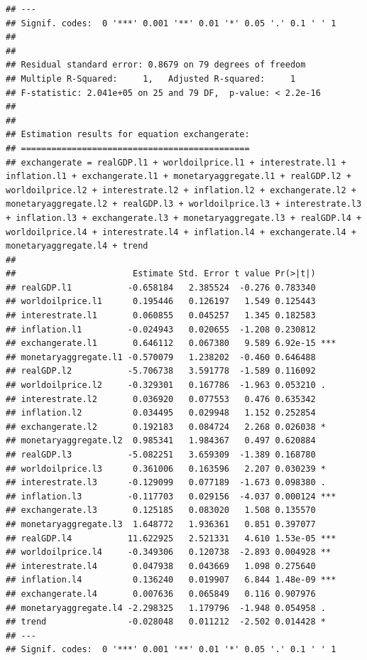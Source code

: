 \documentclass[11pt,preprint, authoryear]{elsarticle}
\numberwithin{equation}{section}
\numberwithin{figure}{section}
\numberwithin{table}{section}
\begin{document}
\begin{verbatim}
## ---
## Signif. codes:  0 '***' 0.001 '**' 0.01 '*' 0.05 '.' 0.1 ' ' 1
## 
## 
## Residual standard error: 0.8679 on 79 degrees of freedom
## Multiple R-Squared:     1,   Adjusted R-squared:     1 
## F-statistic: 2.041e+05 on 25 and 79 DF,  p-value: < 2.2e-16 
## 
## 
## Estimation results for equation exchangerate: 
## ============================================= 
## exchangerate = realGDP.l1 + worldoilprice.l1 + interestrate.l1 + inflation.l1 + exchangerate.l1 + monetaryaggregate.l1 + realGDP.l2 + worldoilprice.l2 + interestrate.l2 + inflation.l2 + exchangerate.l2 + monetaryaggregate.l2 + realGDP.l3 + worldoilprice.l3 + interestrate.l3 + inflation.l3 + exchangerate.l3 + monetaryaggregate.l3 + realGDP.l4 + worldoilprice.l4 + interestrate.l4 + inflation.l4 + exchangerate.l4 + monetaryaggregate.l4 + trend 
## 
##                       Estimate Std. Error t value Pr(>|t|)    
## realGDP.l1           -0.658184   2.385524  -0.276 0.783340    
## worldoilprice.l1      0.195446   0.126197   1.549 0.125443    
## interestrate.l1       0.060855   0.045257   1.345 0.182583    
## inflation.l1         -0.024943   0.020655  -1.208 0.230812    
## exchangerate.l1       0.646112   0.067380   9.589 6.92e-15 ***
## monetaryaggregate.l1 -0.570079   1.238202  -0.460 0.646488    
## realGDP.l2           -5.706738   3.591778  -1.589 0.116092    
## worldoilprice.l2     -0.329301   0.167786  -1.963 0.053210 .  
## interestrate.l2       0.036920   0.077553   0.476 0.635342    
## inflation.l2          0.034495   0.029948   1.152 0.252854    
## exchangerate.l2       0.192183   0.084724   2.268 0.026038 *  
## monetaryaggregate.l2  0.985341   1.984367   0.497 0.620884    
## realGDP.l3           -5.082251   3.659309  -1.389 0.168780    
## worldoilprice.l3      0.361006   0.163596   2.207 0.030239 *  
## interestrate.l3      -0.129099   0.077189  -1.673 0.098380 .  
## inflation.l3         -0.117703   0.029156  -4.037 0.000124 ***
## exchangerate.l3       0.125185   0.083020   1.508 0.135570    
## monetaryaggregate.l3  1.648772   1.936361   0.851 0.397077    
## realGDP.l4           11.622925   2.521331   4.610 1.53e-05 ***
## worldoilprice.l4     -0.349306   0.120738  -2.893 0.004928 ** 
## interestrate.l4       0.047938   0.043669   1.098 0.275640    
## inflation.l4          0.136240   0.019907   6.844 1.48e-09 ***
## exchangerate.l4       0.007636   0.065849   0.116 0.907976    
## monetaryaggregate.l4 -2.298325   1.179796  -1.948 0.054958 .  
## trend                -0.028048   0.011212  -2.502 0.014428 *  
## ---
## Signif. codes:  0 '***' 0.001 '**' 0.01 '*' 0.05 '.' 0.1 ' ' 1

\end{verbatim}
\end{document}

